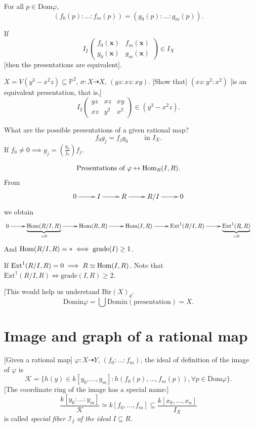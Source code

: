 \noindent
For all $p \in \text{Dom}\varphi$,
 $$
(f_0(p):…:f_m(p))=(g_0(p):…:g_m(p)).
$$

If
$$
I_2
\begin{pmatrix}f_0(\mathbf{x})&f_m(\mathbf{x}
)\\
g_0(\mathbf{x})&g_m(\mathbf{x})\end{pmatrix}
\in I_X
$$
[then the presentations are equivalent].

\begin{exercise}
\label{exercise-standard-quadratic}
$X=V(y^3-x^2z) \subseteq \mathbb{P}^2$,
$\sigma:X \dashrightarrow X$, $(yz:xz:xy)$.
[Show that] $(xz:y^2:x^2)$
[is an equivalent presentation, that is,]
$$
I_2
\begin{pmatrix}
yz & xz & xy\\
xz & y^2 & x^2 \end{pmatrix}
\in (y^3-x^2z).
$$

\end{exercise}

\noindent
What are the possible presentations of a
given rational map?
$$
f_0g_j=f_jg_0\qquad \text{ in }I_X.
$$
If $f_0 \neq 0 \implies
g_j=\left(\frac{g_0}{f_0}\right) f_j$.

\medskip{}
$$
\text{Presentations of } \varphi
\leftrightarrow
\mathop{\mathrm{Hom}}\nolimits_R(I,R).
$$
From
$$
\xymatrix{
0\ar[r]
&I\ar[r]
&R\ar[r]
&R/I\ar[r]
&0
}
$$
we obtain
$$
\xymatrix{
0\ar[r]
&\underbrace{\Hom(R/I,R)}_{=0}\ar[r]
&\Hom(R,R)\ar[r]
&\Hom(I,R)\ar[r]
&\text{Ext}^1(R/I,R)\ar[r]
&\underbrace{\text{Ext}^1(R,R)
}_{=0}}
$$
And $\mathop{\mathrm{Hom}}\nolimits(R/I,R)=\ast \iff \text{grade}(I)
\geq 1$.

If $\text{Ext}^1(R/I,R)=0 \implies R
\simeq\mathop{\mathrm{Hom}}\nolimits(I,R)$.
Note that $\text{Ext}^1(R/I,R) \iff
\text{grade}(I,R)\geq 2$.

[This would help us understand
$\text{Bir}(X)_d$.
$$
\text{Domin}\varphi=\bigcup
\text{Domin}(\text{presentation})=X.
$$


\section{Image and graph of a rational map}
\label{section-image-graph}

[Given a rational map]
$\varphi:X \dashrightarrow Y$, $(f_0:…:f_m)$,
the ideal of definition of the image of
$\varphi$
is
$$
\mathcal{K}
=\{h(y) \in k[y_0,…,y_m]
:h(f_0(p),…,f_m(p)), \forall p \in
\text{Dom}\varphi\}.
$$
[The coordinate ring of the image has a
special name:]
$$
\frac{k[y_0:…:y_m]}{\mathcal{K}}
\simeq k[f_0,…,f_m]
\subseteq\frac{k[x_0,…,x_n]}{I_X}
$$
is called {\it special fiber $\mathcal{I}_I$
of the ideal $I\subseteq R$}.

